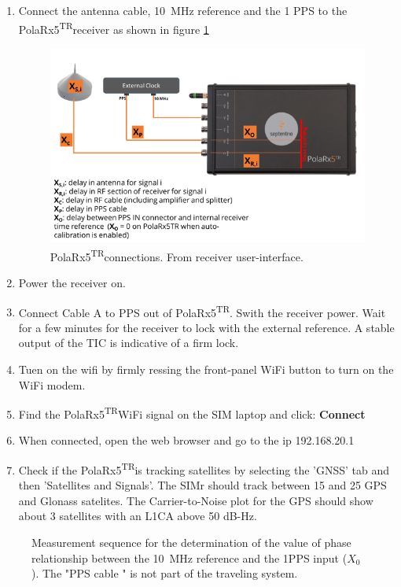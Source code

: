 \documentclass[11pt]{article}
\newcommand{\polar}[0]{PolaRx5\textsuperscript{TR}}
\begin{document}
\begin{enumerate}
    \item Connect the antenna cable, \SI{10}{\mega\hertz} reference and the 1 PPS to the \polar receiver as shown in figure \ref{fig:cggttsdelays.png}
    
    \begin{figure}[ht]
    \begin{center}
    \includegraphics[width=0.8\linewidth]{./Figures/cggttsdelays.png}
    \caption{\polar connections. From receiver user-interface. } \label{fig:cggttsdelays.png}
    \end{center}
    \end{figure}

    
    \item Power the receiver on.
    \item Connect Cable A to PPS out of \polar. Swith the receiver power. Wait for a few minutes for the receiver to lock with the external reference. A stable output of the TIC is indicative of a firm lock.
    \item Tuen on the wifi by firmly ressing the front-panel WiFi button to turn on the WiFi modem.
    \item Find the \polar WiFi signal on the SIM laptop and click: \textbf{Connect}
    \item When connected, open the web browser and go to the ip 192.168.20.1
    \item Check if the \polar is tracking satellites by selecting the 'GNSS' tab and then 'Satellites and Signals'. The SIMr should track between 15 and 25 GPS and Glonass satelites. The Carrier-to-Noise plot for the GPS should show about 3 satellites with an L1CA above 50 dB-Hz.
\end{enumerate}

\begin{figure}[ht]
\begin{center}

\caption{Measurement sequence for the determination of the value of phase relationship between the \SI{10}{\mega\hertz} reference and the 1PPS input ($X_0$). The "PPS cable " is not part of the traveling system.} \label{fig:cabledelaymeasurement}
\end{center}
\end{figure}
\end{document}
